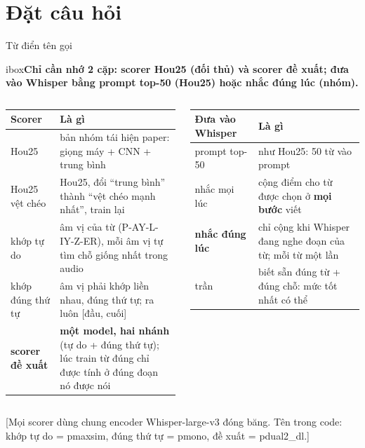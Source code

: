 \documentclass[aspectratio=169,xcolor=table]{beamer}
\newcommand{\src}[1]{\par\vfill{\tiny\color{TextGray}[#1]}}
\newcommand{\nb}[1]{\textcolor{Accent}{#1}}
\newcommand{\insight}[1]{\begin{beamercolorbox}[sep=0.55em,rounded=true]{ibox}\small\bfseries #1\end{beamercolorbox}\vspace{0.15cm}}
\begin{document}
\section{Đặt câu hỏi}
\begin{frame}{Từ điển tên gọi}
\insight{Chỉ cần nhớ 2 cặp: scorer \nb{Hou25} (đối thủ) và \nb{scorer đề xuất}; đưa vào Whisper bằng \nb{prompt top-50} (Hou25) hoặc \nb{nhắc đúng lúc} (nhóm).}
\renewcommand{\arraystretch}{1.12}\scriptsize
\begin{columns}[T]
\begin{tabular}{L{2.2cm}L{5.4cm}}
\toprule
Scorer & Là gì \\
\midrule
Hou25 & bản nhóm tái hiện paper: giọng máy + CNN + trung bình \\
Hou25 vệt chéo & Hou25, đổi ``trung bình'' thành ``vệt chéo mạnh nhất'', train lại \\
khớp tự do & âm vị của từ (P-AY-L-IY-Z-ER), mỗi âm vị tự tìm chỗ giống nhất trong audio \\
khớp đúng thứ tự & âm vị phải khớp liền nhau, đúng thứ tự; ra luôn [đầu, cuối] \\
\textbf{scorer đề xuất} & \textbf{một model, hai nhánh} (tự do + đúng thứ tự); lúc train từ đúng chỉ được tính ở đúng đoạn nó được nói \\
\bottomrule
\end{tabular}
\begin{tabular}{L{2.0cm}L{3.6cm}}
\toprule
Đưa vào Whisper & Là gì \\
\midrule
prompt top-50 & như Hou25: 50 từ vào prompt \\
nhắc mọi lúc & cộng điểm cho từ được chọn ở \textbf{mọi bước} viết \\
\textbf{nhắc đúng lúc} & chỉ cộng khi Whisper đang nghe đoạn của từ; mỗi từ một lần \\
trần & biết sẵn đúng từ + đúng chỗ: mức tốt nhất có thể \\
\bottomrule
\end{tabular}
\end{columns}
\src{Mọi scorer dùng chung encoder Whisper-large-v3 đóng băng. Tên trong code: khớp tự do = pmaxsim, đúng thứ tự = pmono, đề xuất = pdual2\_dl.}
\end{frame}
\end{document}
